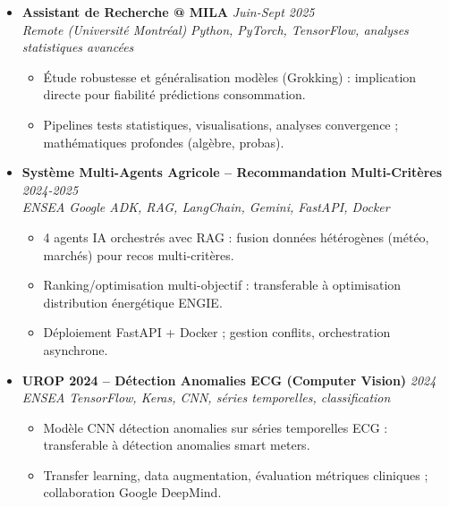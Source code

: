 \documentclass[a4paper,11pt]{article}
\begin{document}
\begin{itemize}[leftmargin=*, label=\tiny$\bullet$, nosep]
    \item \textbf{Assistant de Recherche @ MILA} \hfill \textit{Juin-Sept 2025} \\
    \textit{Remote (Universit\'e Montr\'eal)} \hfill \textit{Python, PyTorch, TensorFlow, analyses statistiques avanc\'ees}
    \vspace{-2pt}
    \begin{itemize}[leftmargin=0.4cm, nosep, label=\tiny$\bullet$]
        \item \small{\'Etude robustesse et g\'en\'eralisation mod\`eles (Grokking) : implication directe pour fiabilit\'e pr\'edictions consommation.}
        \item \small{Pipelines tests statistiques, visualisations, analyses convergence ; math\'ematiques profondes (alg\`ebre, probas).}
    \end{itemize}
    \vspace{3pt}

    \item \textbf{Syst\`eme Multi-Agents Agricole -- Recommandation Multi-Crit\`eres} \hfill \textit{2024-2025} \\
    \textit{ENSEA} \hfill \textit{Google ADK, RAG, LangChain, Gemini, FastAPI, Docker}
    \vspace{-2pt}
    \begin{itemize}[leftmargin=0.4cm, nosep, label=\tiny$\bullet$]
        \item \small{4 agents IA orchestr\'es avec RAG : fusion donn\'ees h\'et\'erog\`enes (m\'et\'eo, marchés) pour recos multi-crit\`eres.}
        \item \small{Ranking/optimisation multi-objectif : transferable \`a optimisation distribution \'energétique ENGIE.}
        \item \small{D\'eploiement FastAPI + Docker ; gestion conflits, orchestration asynchrone.}
    \end{itemize}
    \vspace{3pt}

    \item \textbf{UROP 2024 -- D\'etection Anomalies ECG (Computer Vision)} \hfill \textit{2024} \\
    \textit{ENSEA} \hfill \textit{TensorFlow, Keras, CNN, s\'eries temporelles, classification}
    \vspace{-2pt}
    \begin{itemize}[leftmargin=0.4cm, nosep, label=\tiny$\bullet$]
        \item \small{Mod\`ele CNN d\'etection anomalies sur s\'eries temporelles ECG : transferable \`a d\'etection anomalies smart meters.}
        \item \small{Transfer learning, data augmentation, \'evaluation m\'etriques cliniques ; collaboration Google DeepMind.}
    \end{itemize}
    \vspace{3pt}


\end{itemize}
\end{document}
